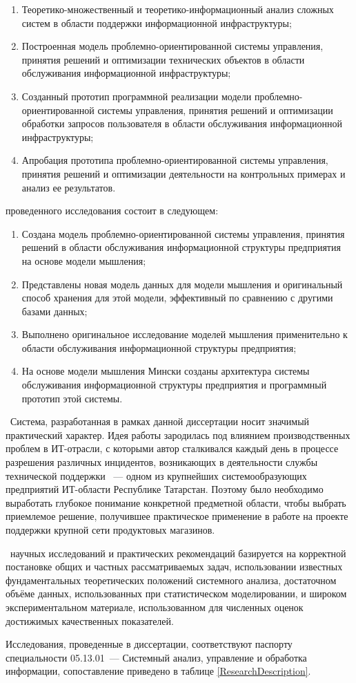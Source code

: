 \begin{enumerate}
  \item Теоретико-множественный и теоретико-информационный анализ сложных систем в области поддержки информационной инфраструктуры;
  \item Построенная модель проблемно-ориентированной системы управления, принятия решений и оптимизации технических объектов в области обслуживания информационной инфраструктуры;
  \item Созданный прототип программной реализации модели проблемно-ориентированной системы управления, принятия решений и оптимизации обработки запросов пользователя в области обслуживания информационной инфраструктуры;
  \item Апробация прототипа проблемно-ориентированной системы управления, принятия решений и оптимизации деятельности на контрольных примерах и анализ ее результатов.
\end{enumerate}

\novelty проведенного исследования состоит в следующем:
\begin{enumerate}
  \item Создана модель проблемно-ориентированной системы управления, принятия решений в области обслуживания информационной структуры предприятия на основе модели мышления;
  \item Представлены новая модель данных для модели мышления и оригинальный способ хранения для этой модели, эффективный по сравнению с другими базами данных;
  \item Выполнено оригинальное исследование моделей мышления применительно к области обслуживания информационной структуры предприятия;
  \item На основе модели мышления Мински созданы архитектура системы обслуживания информационной структуры предприятия и программный прототип этой системы.
\end{enumerate}

\influence\ 
Система, разработанная в рамках данной диссертации носит значимый практический характер. Идея работы зародилась под влиянием производственных проблем в ИТ-отрасли, с которыми автор сталкивался каждый день в процессе разрешения различных инцидентов, возникающих в деятельности службы технической поддержки \icl~--- одном из крупнейших системообразующих предприятий ИТ-области Республике Татарстан. Поэтому было необходимо выработать глубокое понимание конкретной предметной области, чтобы выбрать приемлемое решение, получившее практическое применение в работе на проекте поддержки крупной сети продуктовых магазинов. \par
\reliability\ научных исследований и практических рекомендаций
базируется на корректной постановке общих и частных рассматриваемых задач,  использовании известных фундаментальных теоретических положений системного анализа, достаточном объёме данных, использованных при статистическом моделировании, и широком экспериментальном материале, использованном для численных оценок достижимых качественных показателей. \par 
Исследования, проведенные в диссертации, соответствуют паспорту специальности 05.13.01~--- Системный анализ, управление и обработка информации, сопоставление приведено в таблице \ref{ResearchDescription}.

